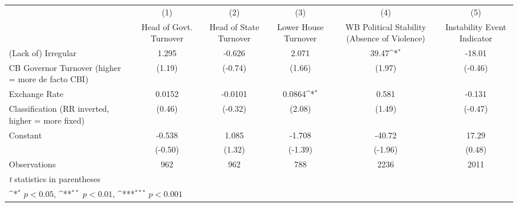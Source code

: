 {
\def\sym#1{\ifmmode^{#1}\else\(^{#1}\)\fi}
\begin{tabular}{l*{5}{c}}
\hline\hline
                    &\multicolumn{1}{c}{(1)}&\multicolumn{1}{c}{(2)}&\multicolumn{1}{c}{(3)}&\multicolumn{1}{c}{(4)}&\multicolumn{1}{c}{(5)}\\
                    &\multicolumn{1}{c}{Head of Govt. Turnover}&\multicolumn{1}{c}{Head of State Turnover}&\multicolumn{1}{c}{Lower House Turnover}&\multicolumn{1}{c}{WB Political Stability (Absence of Violence)}&\multicolumn{1}{c}{Instability Event Indicator}\\
\hline
(Lack of) Irregular &       1.295         &      -0.626         &       2.071         &       39.47\sym{*}  &      -18.01         \\
CB Governor Turnover (higher = more de facto CBI)&      (1.19)         &     (-0.74)         &      (1.66)         &      (1.97)         &     (-0.46)         \\
[1em]
Exchange Rate       &      0.0152         &     -0.0101         &      0.0864\sym{*}  &       0.581         &      -0.131         \\
Classification (RR inverted, higher = more fixed)&      (0.46)         &     (-0.32)         &      (2.08)         &      (1.49)         &     (-0.47)         \\
[1em]
Constant            &      -0.538         &       1.085         &      -1.708         &      -40.72         &       17.29         \\
                    &     (-0.50)         &      (1.32)         &     (-1.39)         &     (-1.96)         &      (0.48)         \\
\hline
Observations        &         962         &         962         &         788         &        2236         &        2011         \\
\hline\hline
\multicolumn{6}{l}{\footnotesize \textit{t} statistics in parentheses}\\
\multicolumn{6}{l}{\footnotesize \sym{*} \(p<0.05\), \sym{**} \(p<0.01\), \sym{***} \(p<0.001\)}\\
\end{tabular}
}
